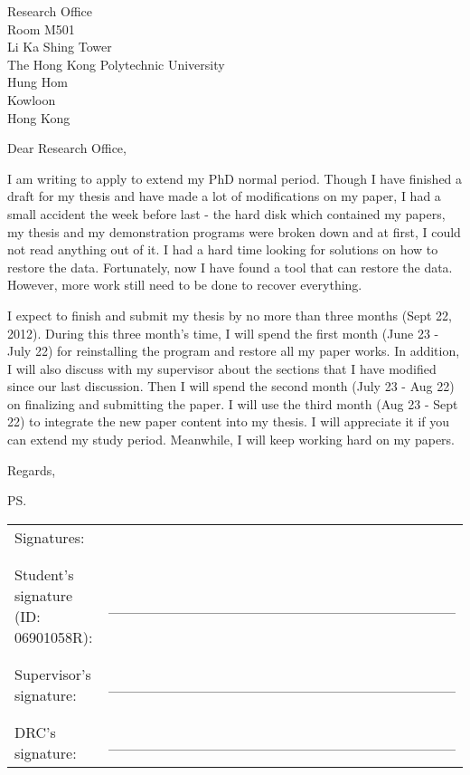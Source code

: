\documentclass[a4paper]{letter}
\begin{document}
\signature{Steven Lai}
\address{Room QT405 \\ The Hong Kong Polytechnic University \\ Hung Hom \\ Kowloon \\ Hong Kong}

\begin{letter}{Research Office \\ Room M501 \\ Li Ka Shing Tower \\ The Hong Kong Polytechnic University \\ Hung Hom \\ Kowloon \\ Hong Kong}
\opening{Dear Research Office,}

I am writing to apply to extend my PhD normal period. Though I have finished a draft for my thesis and have made a lot of modifications on my paper, I had a small accident the week before last - the hard disk which contained my papers, my thesis and my demonstration programs were broken down and at first, I could not read anything out of it. I had a hard time looking for solutions on how to restore the data. Fortunately, now I have found a tool that can restore the data. However, more work still need to be done to recover everything.

I expect to finish and submit my thesis by no more than three months (Sept 22, 2012). During this three month's time, I will spend the first month (June 23 - July 22) for reinstalling the program and restore all my paper works. In addition, I will also discuss with my supervisor about the sections that I have modified since our last discussion. Then I will spend the second month (July 23 - Aug 22) on finalizing and submitting the paper. I will use the third month (Aug 23 - Sept 22) to integrate the new paper content into my thesis. I will appreciate it if you can extend my study period. Meanwhile, I will keep working hard on my papers.

\closing{Regards,}
\ps{\begin{tabular}{  p{8cm}  p{6cm}  }
Signatures:\\\\\\
Student's signature (ID: 06901058R): & \_\_\_\_\_\_\_\_\_\_\_\_\_\_\_\_\_\_\_\_\_\_\_\_\_\_\_\_\_\_\_\_ \\\\\\
Supervisor's signature: & \_\_\_\_\_\_\_\_\_\_\_\_\_\_\_\_\_\_\_\_\_\_\_\_\_\_\_\_\_\_\_\_ \\\\\\
DRC's signature: & \_\_\_\_\_\_\_\_\_\_\_\_\_\_\_\_\_\_\_\_\_\_\_\_\_\_\_\_\_\_\_\_
\end{tabular}}

\end{letter}


%
\end{document}
